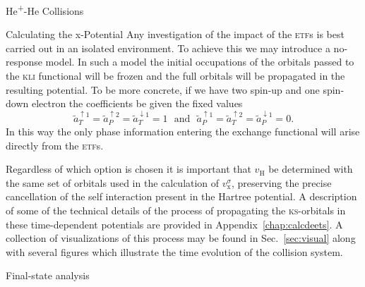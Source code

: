 \documentclass[letterpaper, 11 pt]{report}
\begin{document}
\begin{chapter}{\texorpdfstring{He\textsuperscript{+}}{He+}-He Collisions \label{chap:hephe}}
\begin{section}{Calculating the x-Potential \label{sec:pot}}
      Any investigation of the impact of the \textsc{etf}s is best carried out in an isolated
      environment. To achieve this we may introduce a no-response model. In such a model the initial
      occupations of the orbitals passed to the \textsc{kli} functional will be frozen and the full
      orbitals will be propagated in the resulting potential. To be more concrete, if we have two
      spin-up and one spin-down electron the coefficients be given the fixed values
      \begin{equation} \label{eq:noresp}
         \tilde{a}^{\uparrow 1}_T = \tilde{a}^{\uparrow 2}_P = \tilde{a}^{\downarrow 1}_T  = 1
         ~~~ \mbox{and} ~~~
         \tilde{a}^{\uparrow 1}_P = \tilde{a}^{\uparrow 2}_T = \tilde{a}^{\downarrow 1}_P  = 0.
      \end{equation}
      In this way the only phase information entering the exchange functional will arise directly from
      the \textsc{etf}s.

      Regardless of which option is chosen it is important that $v_\mathrm{H}$ be determined with the
      same set of orbitals used in the calculation of $v_\mathrm{x}^\sigma$, preserving the precise
      cancellation of the self interaction present in the Hartree potential. A description of some of
      the technical details of the process of propagating the \textsc{ks}-orbitals in these
      time-dependent potentials are provided in Appendix~\ref{chap:calcdeets}. A collection of
      visualizations of this process may be found in Sec.~\ref{sec:visual} along with several figures
      which illustrate the time evolution of the collision system.

   \end{section}

   \begin{section}{Final-state analysis \label{sec:hephe-det}}


\end{section}
\end{chapter}
\end{document}
